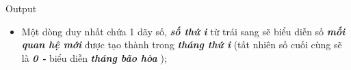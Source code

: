 Output
\begin{itemize}
	\item     Một dòng duy nhất chứa 1 dãy số,    \emph{\textbf{      số thứ i     }}    từ trái sang sẽ biểu diễn số    \emph{\textbf{      mối quan hệ mới     }}    được tạo thành trong    \emph{\textbf{      tháng thứ i     }}    (tất nhiên số cuối cùng sẽ là    \emph{\textbf{      0 -     }}    biểu diễn    \emph{\textbf{      tháng bão hòa     }}    );   
\end{itemize}